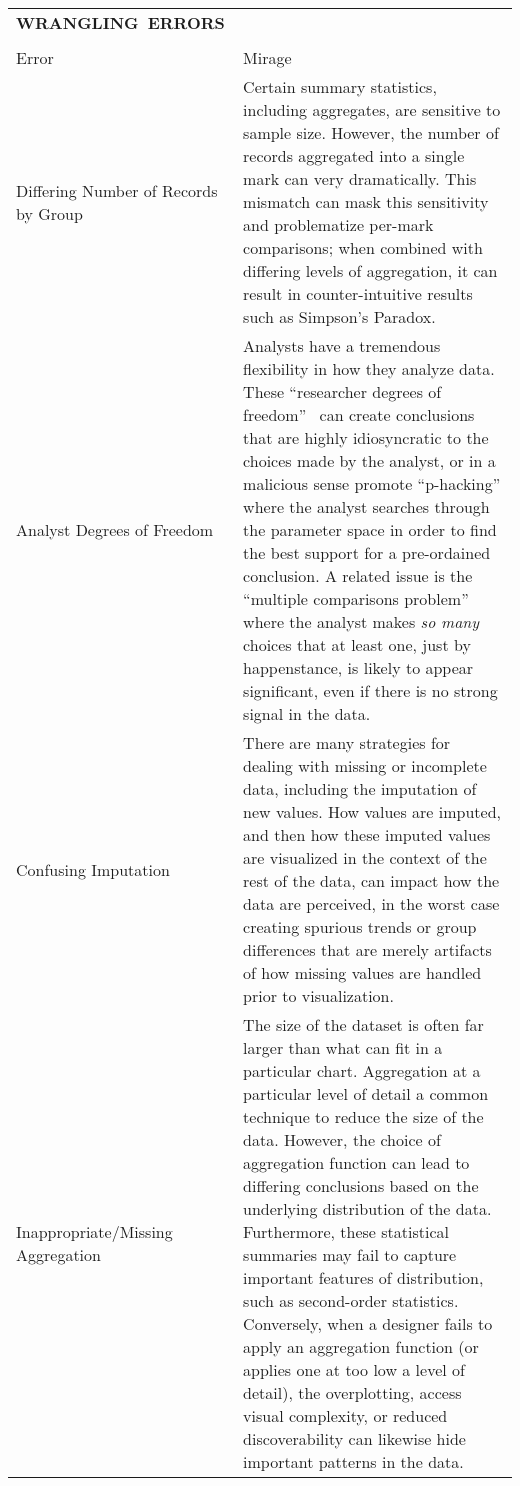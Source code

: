 \begin{longtable}{>{\raggedright\arraybackslash}p{3cm}p{14cm}}
  \\\hbox{\normalsize{\textbf{WRANGLING ERRORS}}}&\\ \\
  \normalsize{Error} & \normalsize{Mirage}\\ \hline
   \rowcolor{colorb}Differing Number  of Records by  Group  & Certain summary statistics, including aggregates, are sensitive to sample size. However, the number of records aggregated into a single mark can very dramatically. This mismatch can mask this sensitivity and problematize per-mark comparisons; when combined with differing levels of aggregation, it can result in counter-intuitive results such as Simpson's Paradox. \cite{guo2017you}\\
 \rowcolor{colorb-opaque}Analyst Degrees of Freedom  & Analysts have a tremendous flexibility in how they analyze data. These ``researcher degrees of freedom''~\cite{gelman2013garden} can create conclusions that are highly idiosyncratic to the choices made by the analyst, or in a malicious sense promote ``p-hacking'' where the analyst searches through the parameter space in order to find the best support for a pre-ordained conclusion. A related issue is the ``multiple comparisons problem'' where the analyst makes \emph{so many} choices that at least one, just by happenstance, is likely to appear significant, even if there is no strong signal in the data. \cite{gelman2013garden,pu2018garden,zgraggen2018investigating}\\
 \rowcolor{colorb}Confusing Imputation  & There are many strategies for dealing with missing or incomplete data, including the imputation of new values. How values are imputed, and then how these imputed values are visualized in the context of the rest of the data, can impact how the data are perceived, in the worst case creating spurious trends or group differences that are merely artifacts of how missing values are handled prior to visualization. \cite{song2018s}\\
 \rowcolor{colorb-opaque}Inappropriate/Missing Aggregation  & The size of the dataset is often far larger than what can fit in a particular chart. Aggregation at a particular level of detail a common technique to reduce the size of the data. However, the choice of aggregation function can lead to differing conclusions based on the underlying distribution of the data. Furthermore, these statistical summaries may fail to capture important features of distribution, such as second-order statistics. Conversely, when a designer fails to apply an aggregation function (or applies one at too low a level of detail), the overplotting, access visual complexity, or reduced discoverability can likewise hide important patterns in the data. \cite{anscombe1973graphs,few2019loom,matejka2017same,salimi2018bias,wall2017warning}\\
  


\end{longtable}
